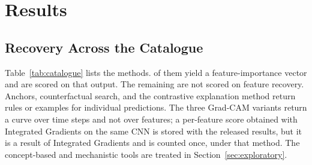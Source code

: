 \documentclass[conference]{IEEEtran}
\begin{document}
\begin{table}[t]
\caption{The \nXaiMethodsCatalogued{} catalogued methods. For the scored
methods, an entry is the number of models on which the planted signal was
ranked above the noise feature over the number of models scored (training
before \scoreYear, scoring on \scoreYear). DT: decision tree; RF: random
forest; XGB: XGBoost; LGBM: LightGBM; CatB: CatBoost; LR: logistic
regression; SVM: support vector machine; Trf: Transformer.}
\label{tab:catalogue}
\centering\scriptsize
\setlength{\tabcolsep}{3pt}

\end{table}

\begin{table}[t]
\caption{Stock-level recovery on \faithUniverseN{} stocks, scored on
\scoreYear. \emph{Stocks}: share of stocks in which the planted signal is
ranked above the noise feature. \emph{Margin}: mean importance of the signal
minus that of the noise feature, with the 95\% interval from \nBootstrap{}
resamples of stocks. Margins are in the units of each method and are
compared with zero only, never across rows. \emph{Credit share}: importance
of the copy divided by the summed importances of the copy and its source.
$^{\dagger}$Defined for \nCreditPermutation{} of the \faithUniverseN{}
stocks only.}
\label{tab:core}
\centering\footnotesize
\setlength{\tabcolsep}{4.5pt}

\end{table}

\section{Results}
\label{sec:results}
\subsection{Recovery Across the Catalogue}
Table~\ref{tab:catalogue} lists the \nXaiMethodsCatalogued{} methods.
\nXaiNativeScored{} of them yield a feature-importance vector and are scored
on that output. The remaining \nXaiNotScored{} are not scored on feature
recovery. Anchors, counterfactual search, and the contrastive explanation
method return rules or examples for individual predictions. The three
Grad-CAM variants return a curve over time steps and not over features; a
per-feature score obtained with Integrated Gradients on the same CNN is
stored with the released results, but it is a result of Integrated Gradients
and is counted once, under that method. The concept-based and mechanistic
tools are treated in Section~\ref{sec:exploratory}.
\end{document}
